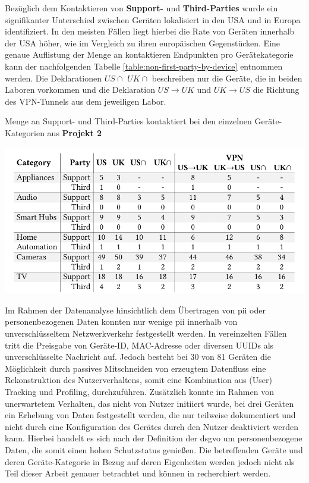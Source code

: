 \noindent Bezüglich dem Kontaktieren von \textbf{Support-} und \textbf{Third-Parties} wurde ein signifikanter Unterschied zwischen Geräten lokalisiert in den USA und in Europa identifiziert. In den meisten Fällen liegt hierbei die Rate von Geräten innerhalb der USA höher, wie im Vergleich zu ihren europäischen Gegenstücken. Eine genaue Auflistung der Menge an kontaktieren Endpunkten pro Gerätekategorie kann der nachfolgenden Tabelle \ref{table:non-first-party-by-device} entnommen werden. Die Deklarationen $US\cap$ $UK\cap$ beschreiben nur die Geräte, die in beiden Laboren vorkommen und die Deklaration $US \rightarrow UK$ und $UK \rightarrow US$ die Richtung des VPN-Tunnels aus dem jeweiligen Labor.
\begin{table}[bp!]
    \caption{Menge an Support- und Third-Parties kontaktiert bei den einzelnen Geräte-Kategorien aus \textbf{Projekt 2} \cite{Ren2019}}
    \includegraphics[width=\textwidth]{main/pictures/projekt_two/Non_First_Party_By_Category}
    \label{table:non-first-party-by-device}
\end{table}

\noindent Im Rahmen der Datenanalyse hinsichtlich dem Übertragen von \ac{pii} oder personenbezogenen Daten konnten nur wenige \ac{pii} innerhalb von unverschlüsseltem Netzwerkverkehr festgestellt werden. In vereinzelten Fällen tritt die Preisgabe von Geräte-ID, MAC-Adresse oder diversen UUIDs als unverschlüsselte Nachricht auf. Jedoch besteht bei 30 von 81 Geräten die Möglichkeit durch passives Mitschneiden von erzeugtem Datenfluss eine Rekonstruktion des Nutzerverhaltens, somit eine Kombination aus (User) Tracking und Profiling, durchzuführen. Zusätzlich konnte im Rahmen von unerwartetem Verhalten, das nicht von Nutzer initiiert wurde, bei drei Geräten ein Erhebung von Daten festgestellt werden, die nur teilweise dokumentiert und nicht durch eine Konfiguration des Gerätes durch den Nutzer deaktiviert werden kann. Hierbei handelt es sich nach der Definition der \ac{dsgvo} um personenbezogene Daten, die somit einen hohen Schutzstatus genießen. Die betreffenden Geräte und deren Geräte-Kategorie in Bezug auf deren Eigenheiten werden jedoch nicht als Teil dieser Arbeit genauer betrachtet und können in \cite{Ren2019} recherchiert werden.

